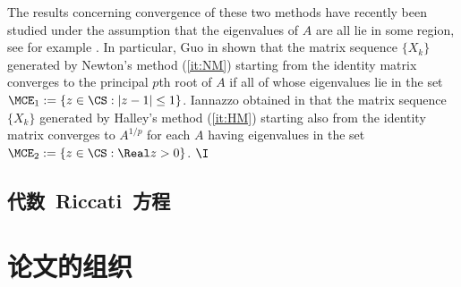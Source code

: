 The results concerning convergence of these two methods have
recently been studied under the assumption that the eigenvalues of
$A$ are all lie in some region, see for example
\cite{GuoHigham2006,Guo2010,Iannazzo2006,Iannazzo2008,Lin2010,Zietak2013}.
In particular, Guo in \cite{Guo2010} shown that the matrix sequence
$\{X_k\}$ generated by Newton's method (\ref{it:NM}) starting from
the identity matrix converges to the principal $p$th root of $A$ if
all of whose eigenvalues lie in the set $\MCE_1 :=\{z\in\CS:
|z-1|\leq 1\}$. Iannazzo obtained in \cite{Iannazzo2008} that the
matrix sequence $\{X_k\}$ generated by Halley's method (\ref{it:HM})
starting also from the identity matrix converges to $A^{1/p}$ for
each $A$ having eigenvalues in the set $\MCE_2 := \{z\in\CS: \Real z
> 0\}$.
$\I$







\subsection{代数~Riccati~方程}






























\section{论文的组织}

